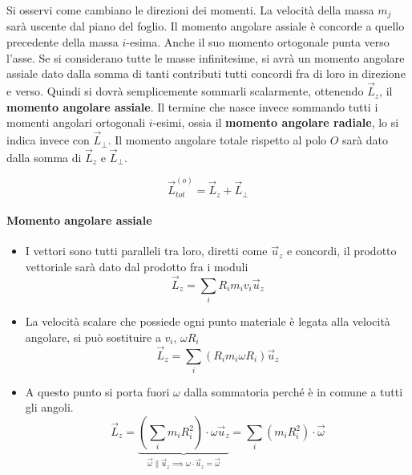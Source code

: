 \begin{figure}[htpb]
\end{figure}
\FloatBarrier
Si osservi come cambiano le direzioni dei momenti. La velocità della massa $m_j$ sarà uscente dal piano del foglio. Il momento angolare assiale è concorde a quello precedente della massa $i$-esima. Anche il suo momento ortogonale punta verso l'asse. Se si considerano tutte le masse infinitesime, si avrà un momento angolare assiale dato dalla somma di tanti contributi tutti concordi fra di loro in direzione e verso. Quindi si dovrà semplicemente sommarli scalarmente, ottenendo $\vec{L}_z$, il \textbf{momento angolare assiale}. Il termine che nasce invece sommando tutti i momenti angolari ortogonali $i$-esimi, ossia il \textbf{momento angolare radiale}, lo si indica invece con $\vec{L}_\perp$. Il momento angolare totale rispetto al polo $O$ sarà dato dalla somma di $\vec{L}_z$ e $\vec{L}_\perp$.

\[
	\boxed{\vec{L}_{tot}^{(o)} = \vec{L}_z + \vec{L}_{\bot}}
\]

\paragraph{Momento angolare assiale}

\begin{itemize}
	\item I vettori sono tutti paralleli tra loro, diretti come $\vec{u}_z$ e concordi, il prodotto vettoriale sarà dato dal prodotto fra i moduli
	\[
		\vec{L}_z = \sum_i R_i m_i v_i \vec{u}_z
	\]
	\item La velocità scalare che possiede ogni punto materiale è legata alla velocità angolare, si può sostituire a $v_i$, $\omega R_i$
	\[
		\vec{L}_z = \sum_i \left(R_i m_i\omega R_i \right) \vec{u}_z
	\]
	\item A questo punto si porta fuori $\omega$ dalla sommatoria perché è in comune a tutti gli angoli.
	\[
		\vec{L}_z = \underbrace{\left( \sum_i m_i R_i^2 \right) \cdot \omega \vec{u}_z}_{\vec{\omega} \parallel \vec{u}_z \implies \omega \cdot \vec{u}_z = \vec{\omega}} = \sum_i \left( m_i R_i^2  \right) \cdot \vec{\omega}
	\]
\end{itemize}

